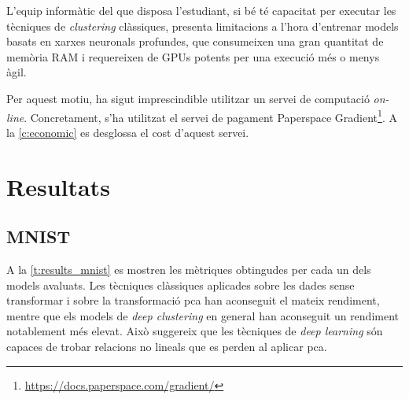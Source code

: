 \documentclass[CAT,BIB]{TFUOC}%
\begin{document}
            L'equip informàtic del que disposa l'estudiant,
            si bé té capacitat per executar les tècniques de \textit{clustering} clàssiques,
            presenta limitacions a l'hora d'entrenar models
            basats en xarxes neuronals profundes,
            que consumeixen una gran quantitat de memòria RAM
            i requereixen de GPUs potents per una execució més o menys àgil.

            Per aquest motiu,
            ha sigut imprescindible utilitzar un servei de computació \textit{on-line}.
            Concretament, s'ha utilitzat el servei de pagament Paperspace Gradient\footnote{\url{https://docs.paperspace.com/gradient/}}.
            A la \cref{c:economic} es desglossa el cost d'aquest servei.



\chapter{Resultats}
\label{c:resultats}

    \section{MNIST}
    \label{s:results_mnist}

        A la \cref{t:results_mnist} es mostren les mètriques
        obtingudes per cada un dels models avaluats.
        Les tècniques clàssiques aplicades sobre les dades sense transformar
        i sobre la transformació \gls{pca}
        han aconseguit el mateix rendiment,
        mentre que els models de \textit{deep clustering}
        en general han aconseguit un rendiment notablement més elevat.
        Això suggereix que les tècniques de \textit{deep learning}
        són capaces de trobar relacions no lineals
        que es perden al aplicar \gls{pca}.
\end{document}
